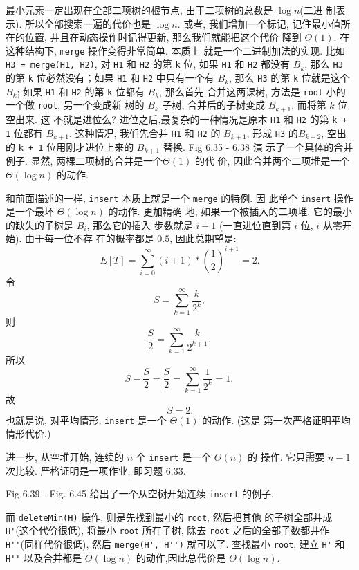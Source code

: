 \documentclass[a4paper]{ctexart}
\theoremstyle{definition}
\theoremstyle{definition}
\begin{document}

最小元素一定出现在全部二项树的根节点, 由于二项树的总数是 $\log n$(二进
制表示). 所以全部搜索一遍的代价也是 $\log n$. 或者, 我们增加一个标记,
记住最小值所在的位置, 并且在动态操作时记得更新, 那么我们就能把这个代价
降到 $\Theta(1)$. 在这种结构下, \verb|merge| 操作变得非常简单. 本质上
就是一个二进制加法的实现. 比如 \verb|H3 = merge(H1, H2)|, 对 \verb|H1|
和 \verb|H2| 的第 \verb|k| 位, 如果 \verb|H1| 和 \verb|H2| 都没有
$B_k$, 那么 \verb|H3| 的第 \verb|k| 位必然没有；如果 \verb|H1| 和
\verb|H2| 中只有一个有 $B_k$, 那么 \verb|H3| 的第 \verb|k| 位就是这个
$B_k$; 如果 \verb|H1| 和 \verb|H2| 的第 \verb|k| 位都有 $B_k$, 那么首先
合并这两课树, 方法是 \verb|root| 小的一个做 \verb|root|, 另一个变成新
树的 $B_k$ 子树, 合并后的子树变成 $B_{k + 1}$, 而将第 $k$ 位空出来. 这
不就是进位么? 进位之后,最复杂的一种情况是原本 \verb|H1| 和 \verb|H2|
的第 \verb|k + 1| 位都有 $B_{k + 1}$. 这种情况, 我们先合并 \verb|H1|
和 \verb|H2| 的 $B_{k + 1}$, 形成 \verb|H3| 的$B_{k + 2}$, 空出的
\verb|k + 1| 位用刚才进位上来的 $B_{k + 1}$ 替换.  Fig 6.35 - 6.38 演
示了一个具体的合并例子.  显然, 两棵二项树的合并是一个$\Theta(1)$ 的代
价, 因此合并两个二项堆是一个 $\Theta(\log n)$ 的动作.

和前面描述的一样, \verb|insert| 本质上就是一个 \verb|merge| 的特例. 因
此单个 \verb|insert| 操作是一个最坏 $\Theta(\log n)$ 的动作. 更加精确
地, 如果一个被插入的二项堆, 它的最小的缺失的子树是 $B_i$, 那么它的插入
步数就是 $i + 1$ (一直进位直到第 $i$ 位, $i$ 从零开始). 由于每一位不存
在的概率都是 $0.5$, 因此总期望是:
$$
E[T] = \sum_{i = 0}^\infty (i + 1) * \left(\frac{1}{2}\right)^{i +
  1} = 2.
$$
令
$$
S = \sum_{k = 1}^\infty \frac{k}{2^k},
$$
则
$$
\frac{S}{2} = \sum_{k = 1}^\infty \frac{k}{2^{k + 1}},
$$
所以
$$
S - \frac{S}{2} = \frac{S}{2} = \sum_{k = 1}^\infty \frac{1}{2^k} = 1,
$$
故
$$
S = 2.
$$
也就是说, 对平均情形, \verb|insert| 是一个 $\Theta(1)$ 的动作. (这是
第一次严格证明平均情形代价.)

进一步, 从空堆开始, 连续的 $n$ 个 \verb|insert| 是一个 $\Theta(n)$ 的
操作. 它只需要 $n - 1$ 次比较. 严格证明是一项作业, 即习题 6.33.


Fig 6.39 - Fig. 6.45 给出了一个从空树开始连续 \verb|insert| 的例子.

而 \verb|deleteMin(H)| 操作, 则是先找到最小的 \verb|root|, 然后把其他
的子树全部并成 \verb|H'|(这个代价很低), 将最小 \verb|root| 所在子树,
除去 \verb|root| 之后的全部子数都并作 \verb|H''|(同样代价很低), 然后
\verb|merge(H', H'')| 就可以了. 查找最小 \verb|root|, 建立 \verb|H'|
和 \verb|H''| 以及合并都是 $\Theta(\log n)$ 的动作,因此总代价是
$\Theta(\log n)$.
\end{document}
